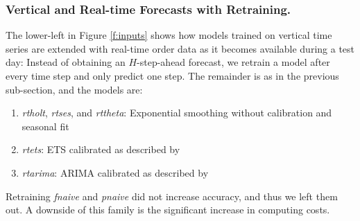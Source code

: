 \subsubsection{Vertical and Real-time Forecasts with Retraining.}
\label{rt}

The lower-left in Figure \ref{f:inputs} shows how models trained on vertical
    time series are extended with real-time order data as it becomes available
    during a test day:
Instead of obtaining an $H$-step-ahead forecast, we retrain a model after
    every time step and only predict one step.
The remainder is as in the previous sub-section, and the models are:
\begin{enumerate}
\item \textit{\gls{rtholt}},
      \textit{\gls{rtses}}, and
      \textit{\gls{rttheta}}:
          Exponential smoothing without calibration and seasonal fit
\item \textit{\gls{rtets}}:
          ETS calibrated as described by \cite{hyndman2008b}
\item \textit{\gls{rtarima}}:
          ARIMA calibrated as described by \cite{hyndman2008a}
\end{enumerate}
Retraining \textit{fnaive} and \textit{pnaive} did not increase accuracy, and
    thus we left them out.
A downside of this family is the significant increase in computing costs.
